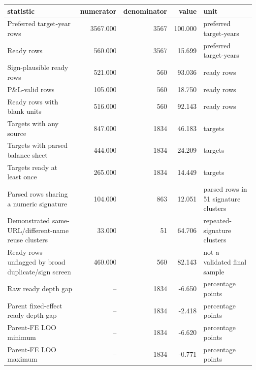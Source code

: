 \begin{tabular}{lrrrl}
\toprule
statistic & numerator & denominator & value & unit \\
\midrule
Preferred target-year rows & 3567.000 & 3567 & 100.000 & preferred target-years \\
Ready rows & 560.000 & 3567 & 15.699 & preferred target-years \\
Sign-plausible ready rows & 521.000 & 560 & 93.036 & ready rows \\
P\&L-valid rows & 105.000 & 560 & 18.750 & ready rows \\
Ready rows with blank units & 516.000 & 560 & 92.143 & ready rows \\
Targets with any source & 847.000 & 1834 & 46.183 & targets \\
Targets with parsed balance sheet & 444.000 & 1834 & 24.209 & targets \\
Targets ready at least once & 265.000 & 1834 & 14.449 & targets \\
Parsed rows sharing a numeric signature & 104.000 & 863 & 12.051 & parsed rows in 51 signature clusters \\
Demonstrated same-URL/different-name reuse clusters & 33.000 & 51 & 64.706 & repeated-signature clusters \\
Ready rows unflagged by broad duplicate/sign screen & 460.000 & 560 & 82.143 & not a validated final sample \\
Raw ready depth gap & -- & 1834 & -6.650 & percentage points \\
Parent fixed-effect ready depth gap & -- & 1834 & -2.418 & percentage points \\
Parent-FE LOO minimum & -- & 1834 & -6.620 & percentage points \\
Parent-FE LOO maximum & -- & 1834 & -0.771 & percentage points \\
\bottomrule
\end{tabular}
